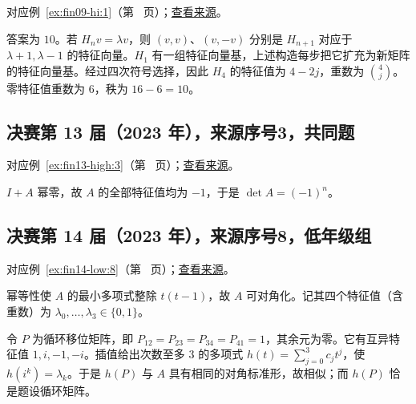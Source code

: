 \documentclass[12pt,fontset=fandol]{ctexart}
\begin{document}
对应例~\ref{ex:fin09-hi:1}（第~\pageref{ex:fin09-hi:1} 页）；\href{https://github.com/lzxcr/cmc-mathematics/blob/64916fa1fdbc3e444a652eca204d5669058ee321/src/problems/finals/09/01.md}{查看来源}。

\begin{solve}

答案为 $10$。若 $H_nv=\lambda v$，则 $(v,v)$、$(v,-v)$ 分别是 $H_{n+1}$ 对应于 $\lambda+1,\lambda-1$ 的特征向量。$H_1$ 有一组特征向量基，上述构造每步把它扩充为新矩阵的特征向量基。经过四次符号选择，因此 $H_4$ 的特征值为 $4-2j$，重数为 $\binom4j$。零特征值重数为 $6$，秩为 $16-6=10$。

\end{solve}

\subsection{决赛第 13 届（2023 年），来源序号3，共同题}\label{ans:fin13-high:3}\label{pr:fin13-high:3}

对应例~\ref{ex:fin13-high:3}（第~\pageref{ex:fin13-high:3} 页）；\href{https://github.com/lzxcr/cmc-mathematics/blob/64916fa1fdbc3e444a652eca204d5669058ee321/src/problems/finals/13/03.md}{查看来源}。

\begin{solve}

$I+A$ 幂零，故 $A$ 的全部特征值均为 $-1$，于是 $\boxed{\det A=(-1)^n}$。

\end{solve}

\subsection{决赛第 14 届（2023 年），来源序号8，低年级组}\label{ans:fin14-low:8}\label{pr:fin14-low:8}

对应例~\ref{ex:fin14-low:8}（第~\pageref{ex:fin14-low:8} 页）；\href{https://github.com/lzxcr/cmc-mathematics/blob/64916fa1fdbc3e444a652eca204d5669058ee321/src/problems/finals/14/08.md}{查看来源}。

\begin{solve}

幂等性使 $A$ 的最小多项式整除 $t(t-1)$，故 $A$ 可对角化。记其四个特征值（含重数）为 $\lambda_0,\dots,\lambda_3\in\{0,1\}$。

令 $P$ 为循环移位矩阵，即 $P_{12}=P_{23}=P_{34}=P_{41}=1$，其余元为零。它有互异特征值 $1,i,-1,-i$。插值给出次数至多 $3$ 的多项式 $h(t)=\sum_{j=0}^3c_jt^j$，使 $h(i^k)=\lambda_k$。于是 $h(P)$ 与 $A$ 具有相同的对角标准形，故相似；而 $h(P)$ 恰是题设循环矩阵。

\end{solve}
\end{document}
